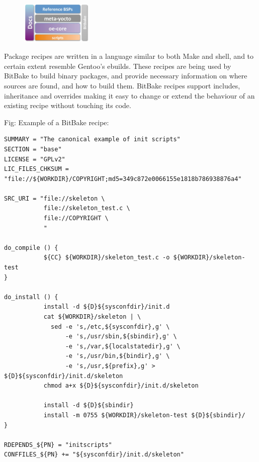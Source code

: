 \documentclass[10pt, a5paper]{article}
\begin{document}
\begin{figure}[h!]
  \centering
  \includegraphics[height=2cm]{w_07_2016_Shadura2.png}
\end{figure}

Package recipes are written in a language similar to both Make and shell, and to certain extent resemble Gentoo's ebuilds. These recipes are being used by BitBake to build binary packages, and provide necessary information on where sources are found, and how to build them. BitBake recipes support includes, inheritance and overrides making it easy to change or extend the behaviour of an existing recipe without touching its code.

Fig: Example of a BitBake recipe:
\lstset{ %
anguage=C,                 %
basicstyle=\small\sffamily, %
breaklines=true,           %
breakatwhitespace=false, %
}

\begin{lstlisting}
SUMMARY = "The canonical example of init scripts"
SECTION = "base"
LICENSE = "GPLv2"
LIC_FILES_CHKSUM = "file://${WORKDIR}/COPYRIGHT;md5=349c872e0066155e1818b786938876a4"

SRC_URI = "file://skeleton \
           file://skeleton_test.c \
           file://COPYRIGHT \
           "

do_compile () {
           ${CC} ${WORKDIR}/skeleton_test.c -o ${WORKDIR}/skeleton-test
}

do_install () {
           install -d ${D}${sysconfdir}/init.d
           cat ${WORKDIR}/skeleton | \
             sed -e 's,/etc,${sysconfdir},g' \
                 -e 's,/usr/sbin,${sbindir},g' \ 
                 -e 's,/var,${localstatedir},g' \ 
                 -e 's,/usr/bin,${bindir},g' \ 
                 -e 's,/usr,${prefix},g' > ${D}${sysconfdir}/init.d/skeleton 
           chmod a+x ${D}${sysconfdir}/init.d/skeleton 

           install -d ${D}${sbindir} 
           install -m 0755 ${WORKDIR}/skeleton-test ${D}${sbindir}/
}

RDEPENDS_${PN} = "initscripts"
CONFFILES_${PN} += "${sysconfdir}/init.d/skeleton"
\end{lstlisting}
\end{document}
